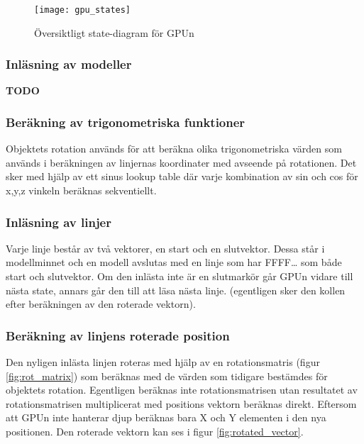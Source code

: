 \documentclass[a4paper]{article}
\begin{document}
    \begin{figure}[H]
        \centering
        \texttt{[image: gpu\_states]}
        \caption{Översiktligt state-diagram för GPUn}
        \label{fig:gpu_states}
    \end{figure}

    \subsubsection{Inläsning av modeller}
    \textbf{TODO}

    \subsubsection{Beräkning av trigonometriska funktioner}
    Objektets rotation används för att beräkna olika trigonometriska värden som
    används i beräkningen av linjernas koordinater med avseende på rotationen. Det
    sker med hjälp av ett sinus lookup table där varje kombination av sin och cos
    för x,y,z vinkeln beräknas sekventiellt. 

    \subsubsection{Inläsning av linjer}
    Varje linje består  av två vektorer, en start och en slutvektor. Dessa står i
    modellminnet och en modell avslutas med en linje som har FFFF… som både start
    och slutvektor. Om den inlästa inte är en slutmarkör går GPUn vidare till nästa
    state, annars går den till att läsa nästa  linje. (egentligen sker den kollen
    efter beräkningen av den  roterade vektorn). 

    \subsubsection{Beräkning av linjens roterade position}
    Den nyligen inlästa linjen roteras med hjälp av en rotationsmatris (figur
    \ref{fig:rot_matrix}) som beräknas med de värden som tidigare bestämdes för
    objektets rotation. Egentligen beräknas inte rotationsmatrisen utan
    resultatet av rotationsmatrisen multiplicerat med positions vektorn beräknas
    direkt. Eftersom att GPUn inte hanterar djup beräknas bara X och  Y
    elementen i den nya positionen. Den roterade vektorn kan ses i
    figur \ref{fig:rotated_vector}. 
\end{document}
